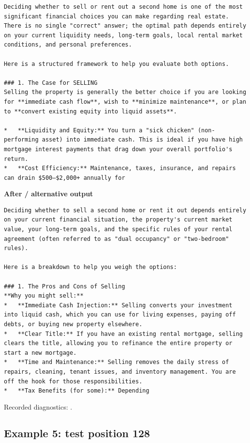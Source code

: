 \begin{Verbatim}
Deciding whether to sell or rent out a second home is one of the most significant financial choices you can make regarding real estate. There is no single "correct" answer; the optimal path depends entirely on your current liquidity needs, long-term goals, local rental market conditions, and personal preferences.

Here is a structured framework to help you evaluate both options.

### 1. The Case for SELLING
Selling the property is generally the better choice if you are looking for **immediate cash flow**, wish to **minimize maintenance**, or plan to **convert existing equity into liquid assets**.

*   **Liquidity and Equity:** You turn a "sick chicken" (non-performing asset) into immediate cash. This is ideal if you have high mortgage interest payments that drag down your overall portfolio's return.
*   **Cost Efficiency:** Maintenance, taxes, insurance, and repairs can drain $500–$2,000+ annually for
\end{Verbatim}

\textbf{After / alternative output}

\begin{Verbatim}
Deciding whether to sell a second home or rent it out depends entirely on your current financial situation, the property's current market value, your long-term goals, and the specific rules of your rental agreement (often referred to as "dual occupancy" or "two-bedroom" rules).

Here is a breakdown to help you weigh the options:

### 1. The Pros and Cons of Selling
**Why you might sell:**
*   **Immediate Cash Injection:** Selling converts your investment into liquid cash, which you can use for living expenses, paying off debts, or buying new property elsewhere.
*   **Clear Title:** If you have an existing rental mortgage, selling clears the title, allowing you to refinance the entire property or start a new mortgage.
*   **Time and Maintenance:** Selling removes the daily stress of repairs, cleaning, tenant issues, and inventory management. You are off the hook for those responsibilities.
*   **Tax Benefits (for some):** Depending
\end{Verbatim}

Recorded diagnostics:
\texttt{}.

\subsection{Example 5: test position
128}\label{record-docs-watermarking-qualitative-text-textseal2-smoothing-md-example-5-test-position-128}

